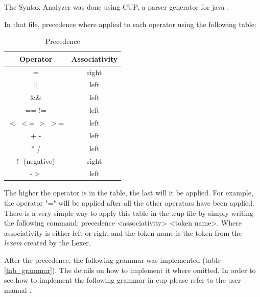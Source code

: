 \documentclass[conference]{IEEEtran}
\theoremstyle{definition}
\begin{document}
The Syntax Analyzer was done using CUP, a parser generator for java \cite{CUP}.

In that file, precedence where applied to each operator using the following table:
\begin{table}[H]
	\begin{center}
	\begin{tabular}{||c c||}
		\hline
		Operator & Associativity  \\ [0.5ex]
		\hline\hline
		= & right \\
		\hline
		$|$$|$ & left  \\
		\hline
		\&\& & left  \\
		\hline
		== != & left  \\
		\hline
		$<$ $<$= $>$ $>$= & left \\ [1ex]
		\hline
		+ - & left \\
		\hline
		* / & left \\
		\hline
		! -(negative) & right \\
		\hline
		-$>$ & left \\
		\hline
	\end{tabular}
	\end{center}
	\caption{Precedence} \label{tab_precedence}
\end{table}

The higher the operator is in the table, the last will it be applied. For example, the operator "=" will be applied after all the other operators have been applied. There is a very simple way to apply this table in the .cup file by simply writing the following command: precedence <associativity> <token name>. Where associativity is either left or right and the token name is the token from the \textit{lexem} created by the Lexer.

After the precedence, the following grammar was implemented (table \ref{tab_grammar}). The details on how to implement it where omitted. In order to see how to implement the following grammar in cup please refer to the user manual \cite{CUP_MANUAL}.
\end{document}
